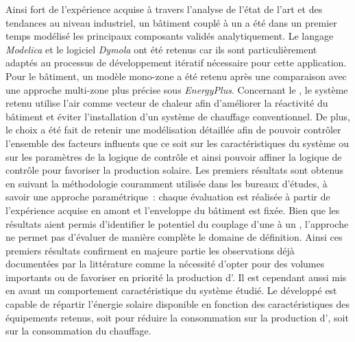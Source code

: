 Ainsi fort de l’expérience acquise à travers l’analyse de l’état de l’art et des tendances
au niveau industriel, un bâtiment couplé à un  a été dans un premier temps
modélisé les principaux composants validés analytiquement. Le langage \textit{Modelica} et le logiciel \textit{Dymola} ont été retenus car
ils sont particulièrement adaptés au processus de développement itératif nécessaire pour
cette application. Pour le bâtiment, un modèle mono-zone a été retenu après une
comparaison avec une approche multi-zone plus précise sous \textit{EnergyPlus}.
Concernant le , le système retenu utilise l’air comme vecteur de chaleur afin
d’améliorer la réactivité du bâtiment et éviter l’installation d’un système de chauffage
conventionnel. De plus, le choix a été fait de retenir une modélisation détaillée afin de
pouvoir contrôler l’ensemble des facteurs influents que ce soit sur les caractéristiques
du système ou sur les paramètres de la logique de contrôle et ainsi pouvoir affiner la
logique de contrôle pour favoriser la production solaire. Les premiers résultats sont
obtenus en suivant la méthodologie couramment utilisée dans les bureaux d’études, à savoir
une approche paramétrique~: chaque évaluation est réalisée à partir de l’expérience
acquise en amont et l’enveloppe du bâtiment est fixée. Bien que les résultats aient permis
d’identifier le potentiel du couplage d’une  à un , l’approche ne
permet pas d’évaluer de manière complète le domaine de définition. Ainsi ces premiers
résultats confirment en majeure partie les observations déjà documentées par la
littérature comme la nécessité d’opter pour des volumes importants ou de favoriser en
priorité la production d’. Il est cependant aussi mis en avant un comportement
caractéristique du système étudié. Le  développé est capable de répartir
l’énergie solaire disponible en fonction des caractéristiques des équipements retenus,
soit pour réduire la consommation sur la production d’, soit sur la consommation
du chauffage.

